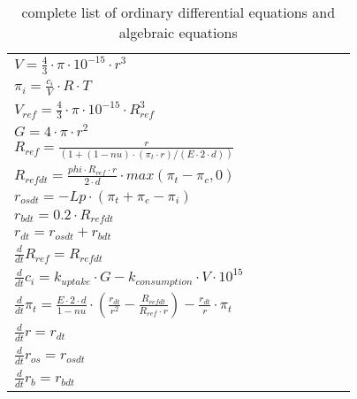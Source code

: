 \begin{table} [h]
	
	\begin{center} 
		\caption{complete list of ordinary differential equations and algebraic equations}
		\begin{tabular} {l l l l l l l l}
			\toprule
			$V = \frac{4}{3}\cdot \pi  \cdot 10^{-15} \cdot r^3$ \\
			$\pi_i = \frac{c_i}{V} \cdot R\cdot T$\\
			$V_{ref} =  \frac{4}{3} \cdot \pi \cdot 10^{-15} \cdot R_{ref}^3$\\
			$G = 4 \cdot  \pi \cdot r^2$\\
			$R_{ref} = \frac{r}{(1 + (1 - nu)\cdot (\pi_t \cdot r) / (E\cdot 2\cdot d))} $\\
			$R_{refdt}= \frac{phi\cdot R_{ref}\cdot r }{2\cdot d} \cdot max(\pi_t- \pi_c, 0)$\\
			$r_{osdt }= - Lp\cdot (\pi_t + \pi_e - \pi_i)$\\
			$r_{bdt} = 0.2\cdot R_{refdt}$\\
			$r_{dt} = r_{osdt} + r_{bdt}$  \\
			$\frac{d}{dt} R_{ref} = R_{refdt}$\\
			$\frac{d}{dt}  c_i = k_{uptake}\cdot G - k_{consumption}\cdot V\cdot 10^{15}$\\
			$\frac{d}{dt} \pi_t = \frac{E\cdot 2\cdot d }{1 - nu} \cdot (\frac{r_{dt}}{r^2 } - \frac{R_{refdt}}{R_{ref} \cdot r}) - \frac{r_{dt}}{ r} \cdot \pi_t$\\
			$\frac{d}{dt}  r = r_{dt}$\\
			$\frac{d}{dt} r_{os} = r_{osdt}$\\
			$\frac{d}{dt}  r_b = r_{bdt}$\\
			
			\bottomrule
		\end{tabular}
		\label{equationsVolume}
	\end{center}
\end{table}


